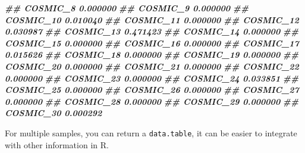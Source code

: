 \documentclass[
  12pt,
  a4paper,
  twoside]{book}
\newenvironment{Shaded}{\begin{snugshade}}{\end{snugshade}}
\newcommand{\DocumentationTok}[1]{\textcolor[rgb]{0.56,0.35,0.01}{\textbf{\textit{#1}}}}
\begin{document}
\begin{Shaded}
\begin{Highlighting}[]
\DocumentationTok{\#\# COSMIC\_8                      0.000000}
\DocumentationTok{\#\# COSMIC\_9                      0.000000}
\DocumentationTok{\#\# COSMIC\_10                     0.010040}
\DocumentationTok{\#\# COSMIC\_11                     0.000000}
\DocumentationTok{\#\# COSMIC\_12                     0.030987}
\DocumentationTok{\#\# COSMIC\_13                     0.471423}
\DocumentationTok{\#\# COSMIC\_14                     0.000000}
\DocumentationTok{\#\# COSMIC\_15                     0.000000}
\DocumentationTok{\#\# COSMIC\_16                     0.000000}
\DocumentationTok{\#\# COSMIC\_17                     0.015626}
\DocumentationTok{\#\# COSMIC\_18                     0.000000}
\DocumentationTok{\#\# COSMIC\_19                     0.000000}
\DocumentationTok{\#\# COSMIC\_20                     0.000000}
\DocumentationTok{\#\# COSMIC\_21                     0.000000}
\DocumentationTok{\#\# COSMIC\_22                     0.000000}
\DocumentationTok{\#\# COSMIC\_23                     0.000000}
\DocumentationTok{\#\# COSMIC\_24                     0.033851}
\DocumentationTok{\#\# COSMIC\_25                     0.000000}
\DocumentationTok{\#\# COSMIC\_26                     0.000000}
\DocumentationTok{\#\# COSMIC\_27                     0.000000}
\DocumentationTok{\#\# COSMIC\_28                     0.000000}
\DocumentationTok{\#\# COSMIC\_29                     0.000000}
\DocumentationTok{\#\# COSMIC\_30                     0.000292}
\end{Highlighting}
\end{Shaded}

For multiple samples, you can return a \texttt{data.table}, it can be easier to integrate with other information in R.
\end{document}
